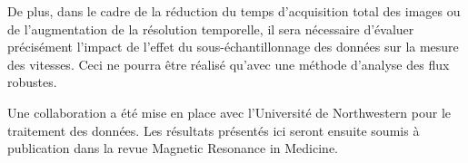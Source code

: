 De plus, dans le cadre de la réduction du temps d’acquisition total des images ou de l’augmentation de la résolution temporelle, il sera nécessaire d’évaluer précisément l’impact de l’effet du sous-échantillonnage des données sur la mesure des vitesses. Ceci ne pourra être réalisé qu’avec une méthode d’analyse des flux robustes. 

Une collaboration a été mise en place avec l’Université de Northwestern pour le traitement des données. Les résultats présentés ici seront ensuite soumis à publication dans la revue Magnetic Resonance in Medicine.
